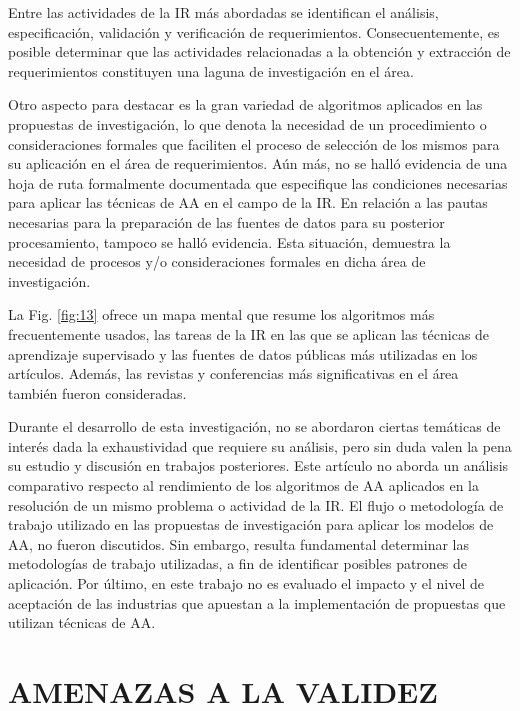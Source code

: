 \documentclass[journal]{IEEEtran}
\begin{document}
Entre las actividades de la IR más abordadas se identifican el análisis, especificación, validación y verificación de requerimientos. Consecuentemente, es posible determinar que las actividades relacionadas a la obtención y extracción de requerimientos constituyen una laguna de investigación en el área. 

Otro aspecto para destacar es la gran variedad de algoritmos aplicados en las propuestas de investigación, lo que denota la necesidad de un procedimiento o consideraciones formales que faciliten el proceso de selección de los mismos para su aplicación en el área de requerimientos. Aún más, no se halló evidencia de una hoja de ruta formalmente documentada que especifique las condiciones necesarias para aplicar las técnicas de AA en el campo de la IR. En relación a las pautas necesarias para la preparación de las fuentes de datos para su posterior procesamiento, tampoco se halló evidencia. Esta situación, demuestra la necesidad de procesos y/o consideraciones formales en dicha área de investigación. 

La Fig. \ref{fig:13} ofrece un mapa mental que resume los algoritmos más frecuentemente usados, las tareas de la IR en las que se aplican las técnicas de aprendizaje supervisado y las fuentes de datos públicas más utilizadas en los artículos. Además, las revistas y conferencias más significativas en el área también fueron consideradas. 

Durante el desarrollo de esta investigación, no se abordaron ciertas temáticas de interés dada la exhaustividad que requiere su análisis, pero sin duda valen la pena su estudio y discusión en trabajos posteriores. Este artículo no aborda un análisis comparativo respecto al rendimiento de los algoritmos de AA aplicados en la resolución de un mismo problema o actividad de la IR. El flujo o metodología de trabajo utilizado en las propuestas de investigación para aplicar los modelos de AA, no fueron discutidos. Sin embargo, resulta fundamental determinar las metodologías de trabajo utilizadas, a fin de identificar posibles patrones de aplicación.  Por último, en este trabajo no es evaluado el impacto y el nivel de aceptación de las industrias que apuestan a la implementación de propuestas que utilizan técnicas de AA. 

\section{AMENAZAS A LA VALIDEZ}
\end{document}
